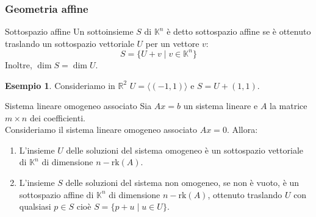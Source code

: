 \documentclass[a4paper]{article}
\theoremstyle{definition}
\newtheorem*{oss}{Osservazione}
\newtheorem*{es}{Esempio}
\begin{document}
\subsubsection{Geometria affine}
	\begin{deff}{Sottospazio affine}{}
		Un sottoinsieme $S$ di $\mathbb{K}^n$ è detto sottospazio affine se è ottenuto traslando un sottospazio vettoriale $U$ per un vettore $v$:
		\[S = \{U + v \mid v \in \mathbb{K}^n\}\]
		Inoltre, $\dim S = \dim U$.
	\end{deff}
	\begin{es}
		Consideriamo in $\mathbb{R}^2$ $U = \langle (-1, 1) \rangle$ e $S = U + (1, 1)$.
	\end{es}
	\begin{teo}{Sistema lineare omogeneo associato}{}
		Sia $Ax = b$ un sistema lineare e $A$ la matrice $m \times n$ dei coefficienti. \\
		Consideriamo il sistema lineare omogeneo associato $Ax = 0$. Allora:
		\begin{enumerate}
			\item L'insieme $U$ delle soluzioni del sistema omogeneo è un sottospazio vettoriale di $\mathbb{K}^n$ di dimensione $n - \text{rk}(A)$.
			\item L'insieme $S$ delle soluzioni del sistema non omogeneo, se non è vuoto, è un sottospazio affine di $\mathbb{K}^n$ di dimensione $n - \text{rk}(A)$,
			ottenuto traslando $U$ con qualsiasi $p \in S$ cioè $S = \{p + u \mid u \in U\}$.
		\end{enumerate}
	\end{teo}
\end{document}
